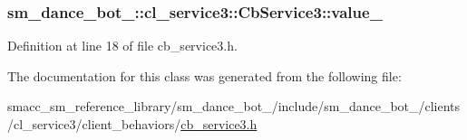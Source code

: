 \subsubsection[{\texorpdfstring{value\+\_\+}{value_}}]{ sm\+\_\+dance\+\_\+bot\+\_\+::cl\+\_\+service3\+::\+Cb\+Service3\+::value\+\_\+\hspace{0.3cm}{\ttfamily [private]}}\hypertarget{classsm__dance__bot__3_1_1cl__service3_1_1CbService3_a91e0447ef3e49053ddfc3c01c2da715a}{}\label{classsm__dance__bot__3_1_1cl__service3_1_1CbService3_a91e0447ef3e49053ddfc3c01c2da715a}


Definition at line 18 of file cb\+\_\+service3.\+h.



The documentation for this class was generated from the following file\+:\begin{DoxyCompactItemize}
\item 
smacc\+\_\+sm\+\_\+reference\+\_\+library/sm\+\_\+dance\+\_\+bot\+\_/include/sm\+\_\+dance\+\_\+bot\+\_/clients/cl\+\_\+service3/client\+\_\+behaviors/\hyperlink{3_2include_2sm__dance__bot__3_2clients_2cl__service3_2client__behaviors_2cb__service3_8h}{cb\+\_\+service3.\+h}\end{DoxyCompactItemize}
